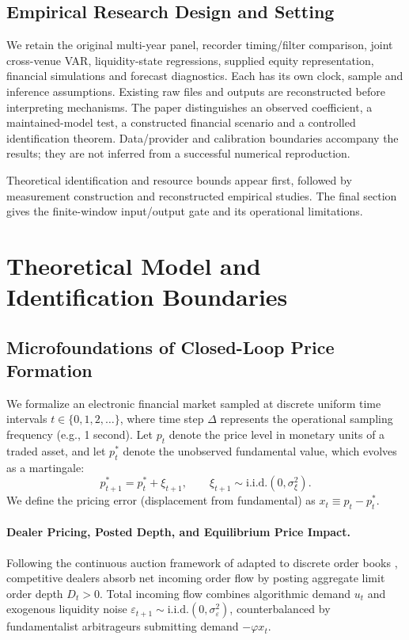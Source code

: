 \documentclass[12pt]{article}
\theoremstyle{definition}
\theoremstyle{remark}
\begin{document}
\subsection{Empirical Research Design and Setting}
We retain the original multi-year panel, recorder timing/filter comparison, joint cross-venue VAR, liquidity-state regressions, supplied equity representation, financial simulations and forecast diagnostics. Each has its own clock, sample and inference assumptions. Existing raw files and outputs are reconstructed before interpreting mechanisms. The paper distinguishes an observed coefficient, a maintained-model test, a constructed financial scenario and a controlled identification theorem. Data/provider and calibration boundaries accompany the results; they are not inferred from a successful numerical reproduction.

Theoretical identification and resource bounds appear first, followed by measurement construction and reconstructed empirical studies. The final section gives the finite-window input/output gate and its operational limitations.


\section{Theoretical Model and Identification Boundaries}
\label{sec:model}

\subsection{Microfoundations of Closed-Loop Price Formation}
We formalize an electronic financial market sampled at discrete uniform time intervals $t \in \{0, 1, 2, \dots\}$, where time step $\Delta$ represents the operational sampling frequency (e.g., 1 second). Let $p_t$ denote the price level in monetary units of a traded asset, and let $p_t^*$ denote the unobserved fundamental value, which evolves as a martingale:
\begin{equation}
p_{t+1}^* = p_t^* + \xi_{t+1}, \qquad \xi_{t+1} \sim \text{i.i.d.}(0, \sigma_\xi^2).
\label{eq:fundamental_process}
\end{equation}
We define the pricing error (displacement from fundamental) as $x_t \equiv p_t - p_t^*$.

\paragraph{Dealer Pricing, Posted Depth, and Equilibrium Price Impact.}
Following the continuous auction framework of \citet{kyle1985continuous} adapted to discrete order books \citep{glosten1985bid,hasbrouck1991,bouchaud2004fluctuations}, competitive dealers absorb net incoming order flow by posting aggregate limit order depth $D_t > 0$. Total incoming flow combines algorithmic demand $u_t$ and exogenous liquidity noise $\varepsilon_{t+1} \sim \text{i.i.d.}(0, \sigma_\varepsilon^2)$, counterbalanced by fundamentalist arbitrageurs submitting demand $-\varphi x_t$.
\end{document}
